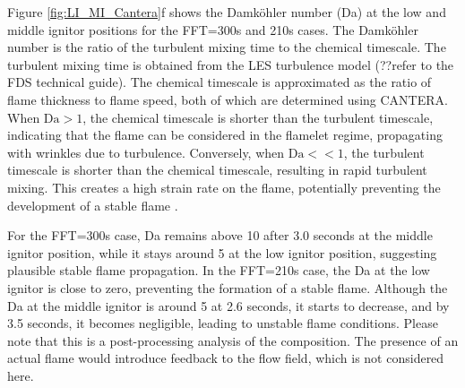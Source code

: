 \documentclass[12pt,letterpaper]{article}
\begin{document}
\begin{flushleft}
Figure \ref{fig:LI_MI_Cantera}f shows the Damk\"{o}hler number (Da) at the low and middle ignitor positions for the FFT=300s and 210s cases. The Damk\"{o}hler number is the ratio of the turbulent mixing time to the chemical timescale. The turbulent mixing time is obtained from the LES turbulence model (??refer to the FDS technical guide). The chemical timescale is approximated as the ratio of flame thickness to flame speed, both of which are determined using CANTERA. When $\mathrm{Da > 1}$, the chemical timescale is shorter than the turbulent timescale, indicating that the flame can be considered in the flamelet regime, propagating with wrinkles due to turbulence. Conversely, when $\mathrm{Da << 1}$, the turbulent timescale is shorter than the chemical timescale, resulting in rapid turbulent mixing. This creates a high strain rate on the flame, potentially preventing the development of a stable flame \cite{HAMPP2019}.

For the FFT=300s case, Da remains above 10 after 3.0 seconds at the middle ignitor position, while it stays around 5 at the low ignitor position, suggesting plausible stable flame propagation. In the FFT=210s case, the Da at the low ignitor is close to zero, preventing the formation of a stable flame. Although the Da at the middle ignitor is around 5 at 2.6 seconds, it starts to decrease, and by 3.5 seconds, it becomes negligible, leading to unstable flame conditions. Please note that this is a post-processing analysis of the composition. The presence of an actual flame would introduce feedback to the flow field, which is not considered here.



\end{flushleft}
\end{document}
